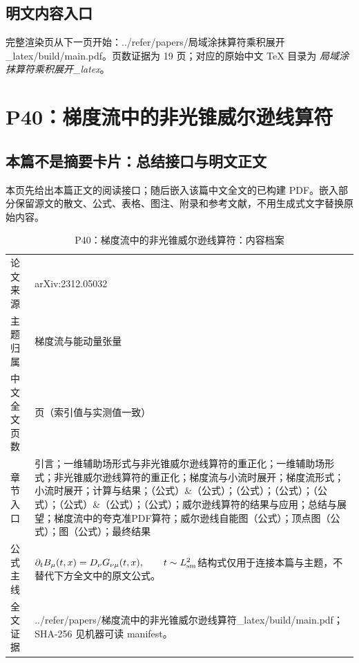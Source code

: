 \documentclass[UTF8,11pt,oneside]{ctexbook}
\begin{document}
\section*{明文内容入口}
\noindent 完整渲染页从下一页开始：../\allowbreak{}refer/\allowbreak{}papers/\allowbreak{}局域涂抹算符乘积展开\_\allowbreak{}latex/\allowbreak{}build/\allowbreak{}main.pdf。页数证据为 19 页；对应的原始中文 TeX 目录为 \emph{局域涂抹算符乘积展开\_latex}。
\clearpage

\clearpage

\chapter{P40：梯度流中的非光锥威尔逊线算符}
\section*{本篇不是摘要卡片：总结接口与明文正文}
本页先给出本篇正文的阅读接口；随后嵌入该篇中文全文的已构建 PDF。嵌入部分保留源文的散文、公式、表格、图注、附录和参考文献，不用生成式文字替换原始内容。
\begin{table}[htbp]
  \centering
  \caption{P40：梯度流中的非光锥威尔逊线算符：内容档案}
  \small
  \begin{tabularx}{0.96\textwidth}{@{}p{3.3cm}>{\raggedright\arraybackslash}X@{}}
    \toprule
    论文来源 & arXiv:2312.05032 \\
    主题归属 & 梯度流与能动量张量 \\
    中文全文页数 & 27 页（索引值与实测值一致） \\
    章节入口 & 引言；一维辅助场形式与非光锥威尔逊线算符的重正化；一维辅助场形式；非光锥威尔逊线算符的重正化；梯度流与小流时展开；梯度流形式；小流时展开；计算与结果；（公式）\&（公式）；（公式）；（公式）；（公式）；（公式）\&（公式）；（公式）；威尔逊线算符的结果与应用；总结与展望；梯度流中的夸克准PDF算符；威尔逊线自能图（公式）；顶点图（公式）；图（公式）；最终结果 \\
    公式主线 & $\partial_t B_\mu(t,x)=D_\nu G_{\nu\mu}(t,x),\qquad t\sim L_{\rm sm}^{2}$\newline\scriptsize 结构式仅用于连接本篇与主题，不替代下方全文中的原文公式。 \\
    全文证据 & ../\allowbreak{}refer/\allowbreak{}papers/\allowbreak{}梯度流中的非光锥威尔逊线算符\_\allowbreak{}latex/\allowbreak{}build/\allowbreak{}main.pdf；SHA-256 见机器可读 manifest。 \\
    \bottomrule
  \end{tabularx}
\end{table}
\end{document}

